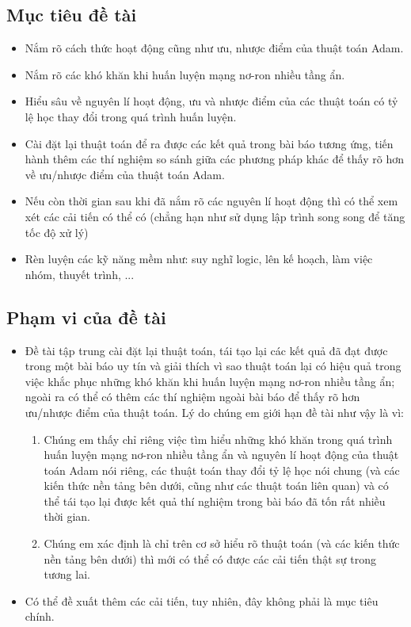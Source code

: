 \documentclass{article}[14pt]
\begin{document}
{    \subsection{Mục tiêu đề tài}
    
    \begin{itemize}
        \item Nắm rõ cách thức hoạt động cũng như ưu, nhược điểm của thuật toán Adam.
        \item Nắm rõ các khó khăn khi huấn luyện mạng nơ-ron nhiều tầng ẩn.
        \item Hiểu sâu về nguyên lí hoạt động, ưu và nhược điểm của các thuật toán có tỷ lệ học thay đổi trong quá trình huấn luyện.
        \item Cài đặt lại thuật toán để ra được các kết quả trong bài báo tương ứng, tiến hành thêm các thí nghiệm so sánh giữa các phương pháp khác để thấy rõ hơn về ưu/nhược điểm của thuật toán Adam.
        \item Nếu còn thời gian sau khi đã nắm rõ các nguyên lí hoạt động thì có thể xem xét các cải tiến có thể có (chẳng hạn như sử dụng lập trình song song để tăng tốc độ xử lý)
        \item Rèn luyện các kỹ năng mềm như: suy nghĩ logic, lên kế hoạch, làm việc nhóm, thuyết trình, ...
    \end{itemize}
    
    \subsection{Phạm vi của đề tài}
    
    \begin{itemize}
        \item Đề tài tập trung cài đặt lại thuật toán, tái tạo lại các kết quả đã đạt được trong một bài báo uy tín và giải thích vì sao thuật toán lại có hiệu quả trong việc khắc phục những khó khăn khi huấn luyện mạng nơ-ron nhiều tầng ẩn; ngoài ra có thể có thêm các thí nghiệm ngoài bài báo để thấy rõ hơn ưu/nhược điểm của thuật toán. Lý do chúng em giới hạn đề tài như vậy là vì:
        \begin{enumerate}
            \item Chúng em thấy chỉ riêng việc tìm hiểu những khó khăn trong quá trình huấn luyện mạng nơ-ron nhiều tầng ẩn và nguyên lí hoạt động của thuật toán Adam nói riêng, các thuật toán thay đổi tỷ lệ học nói chung (và các kiến thức nền tảng bên dưới, cũng như các thuật toán liên quan) và có thể tái tạo lại được kết quả thí nghiệm trong bài báo đã tốn rất nhiều thời gian.
            \item Chúng em xác định là chỉ trên cơ sở hiểu rõ thuật toán (và các kiến thức nền tảng bên dưới) thì mới có thể có được các cải tiến thật sự trong tương lai.
        \end{enumerate}
   \item Có thể đề xuất thêm các cải tiến, tuy nhiên, đây không phải là mục tiêu chính.
    \end{itemize}
    
}
\end{document}

